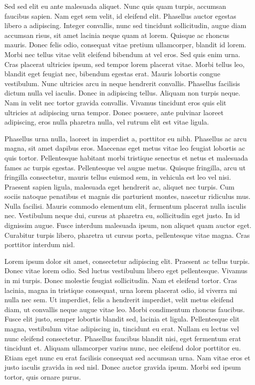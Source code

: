 \documentclass{ufbathesis}
\begin{document}
Sed sed elit eu ante malesuada aliquet. Nunc quis quam turpis, accumsan faucibus sapien. Nam eget sem velit, id eleifend elit. Phasellus auctor egestas libero a adipiscing. Integer convallis, nunc sed tincidunt sollicitudin, augue diam accumsan risus, sit amet lacinia neque quam at lorem. Quisque ac rhoncus mauris. Donec felis odio, consequat vitae pretium ullamcorper, blandit id lorem. Morbi nec tellus vitae velit eleifend bibendum at vel eros. Sed quis enim urna. Cras placerat ultricies ipsum, sed tempor lorem placerat vitae. Morbi tellus leo, blandit eget feugiat nec, bibendum egestas erat. Mauris lobortis congue vestibulum. Nunc ultricies arcu in neque hendrerit convallis. Phasellus facilisis dictum nulla vel iaculis. Donec in adipiscing tellus. Aliquam non turpis neque. Nam in velit nec tortor gravida convallis. Vivamus tincidunt eros quis elit ultricies at adipiscing urna tempor. Donec posuere, ante pulvinar laoreet adipiscing, eros nulla pharetra nulla, vel rutrum elit est vitae ligula.

Phasellus urna nulla, laoreet in imperdiet a, porttitor eu nibh. Phasellus ac arcu magna, sit amet dapibus eros. Maecenas eget metus vitae leo feugiat lobortis ac quis tortor. Pellentesque habitant morbi tristique senectus et netus et malesuada fames ac turpis egestas. Pellentesque vel augue metus. Quisque fringilla, arcu ut fringilla consectetur, mauris tellus euismod sem, in vehicula est leo vel nisi. Praesent sapien ligula, malesuada eget hendrerit ac, aliquet nec turpis. Cum sociis natoque penatibus et magnis dis parturient montes, nascetur ridiculus mus. Nulla facilisi. Mauris commodo elementum elit, fermentum placerat nulla iaculis nec. Vestibulum neque dui, cursus at pharetra eu, sollicitudin eget justo. In id dignissim augue. Fusce interdum malesuada ipsum, non aliquet quam auctor eget. Curabitur turpis libero, pharetra ut cursus porta, pellentesque vitae magna. Cras porttitor interdum nisl.

Lorem ipsum dolor sit amet, consectetur adipiscing elit. Praesent ac tellus turpis. Donec vitae lorem odio. Sed luctus vestibulum libero eget pellentesque. Vivamus in mi turpis. Donec molestie feugiat sollicitudin. Nam et eleifend tortor. Cras lacinia, magna in tristique consequat, urna lorem placerat odio, id viverra mi nulla nec sem. Ut imperdiet, felis a hendrerit imperdiet, velit metus eleifend diam, ut convallis neque augue vitae leo. Morbi condimentum rhoncus faucibus. Fusce elit justo, semper lobortis blandit sed, lacinia et ligula. Pellentesque elit magna, vestibulum vitae adipiscing in, tincidunt eu erat. Nullam eu lectus vel nunc eleifend consectetur. Phasellus faucibus blandit nisi, eget fermentum erat tincidunt et. Aliquam ullamcorper varius nunc, nec eleifend dolor porttitor eu. Etiam eget nunc eu erat facilisis consequat sed accumsan urna. Nam vitae eros et justo iaculis gravida in sed nisl. Donec auctor gravida ipsum. Morbi sed ipsum tortor, quis ornare purus.
\end{document}

